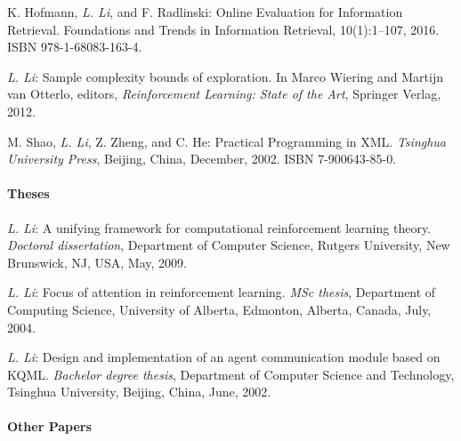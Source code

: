 \documentclass[10pt,twoside,letterpaper]{article}
\newcommand{\selffont}[1]{{\textit{#1}}}
\newcommand{\venuefont}[1]{{\textit{#1}}}
\newcommand{\negitemspace}{\vspace{1mm}}
\newcommand{\myself}{\selffont{L. Li}}
\begin{document}
\begin{compactenum}[(B1)]

\item{K. Hofmann, \myself, and F. Radlinski: Online Evaluation for Information Retrieval.  Foundations and Trends in Information Retrieval, 10(1):1--107, 2016. ISBN 978-1-68083-163-4.}

\item{\myself: Sample complexity bounds of exploration.  In Marco Wiering and Martijn van Otterlo, editors, \venuefont{Reinforcement Learning: State of the Art}, Springer Verlag, 2012.}

\item{M. Shao, \myself, Z. Zheng, and C. He: Practical
Programming in XML. \venuefont{Tsinghua University Press}, Beijing,
China, December, 2002. ISBN 7-900643-85-0.}

\end{compactenum} \negitemspace

\paragraph{Theses} \negitemspace

\begin{compactenum}[(T1)]

\item{\myself: A unifying framework for computational
reinforcement learning theory. \venuefont{Doctoral dissertation},
Department of Computer Science, Rutgers University, New Brunswick,
NJ, USA, May, 2009.}

\item{\myself: Focus of attention in reinforcement learning.
\venuefont{MSc thesis}, Department of Computing Science, University
of Alberta, Edmonton, Alberta, Canada, July, 2004.}

\item{\myself: Design and implementation of an agent
communication module based on KQML. \venuefont{Bachelor degree
thesis}, Department of Computer Science and Technology, Tsinghua
University, Beijing, China, June, 2002.}

\end{compactenum} \negitemspace

\paragraph{Other Papers} \negitemspace
\end{document}
